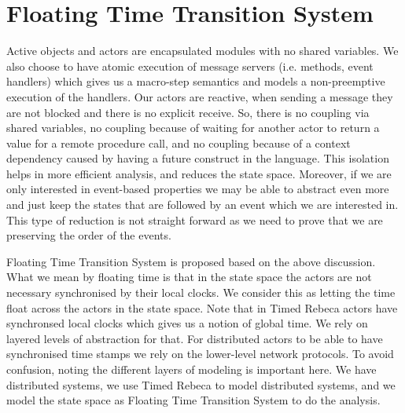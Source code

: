 \section{Floating Time Transition System} \label{sec::FTTS}
Active objects and actors are encapsulated modules with no shared variables. We also choose to have atomic execution of message servers (i.e. methods, event handlers) which gives us a macro-step semantics and models a non-preemptive execution of the handlers.
Our actors are reactive, when sending a message they are not blocked and there is no explicit receive. So, there is no coupling via shared variables, no coupling because of waiting for another actor to return a value for a remote procedure call, and no coupling because of a context dependency caused by having a future  construct in the language.
This isolation helps in more efficient analysis, and reduces the state space.
Moreover, if we are only interested in event-based properties we may be able to abstract even more and just keep the states that are followed by an event which we are interested in. This type of reduction is not straight forward as we need to prove that we are preserving the order of the events.

Floating Time Transition System is proposed based on the above discussion. What we mean by floating time is that in the state space the actors are not necessary synchronised by their local clocks. We consider this as letting the time float across the actors in the state space. 
Note that in Timed Rebeca actors have synchronsed local clocks which gives us a notion of global time. We rely on layered levels of abstraction for that. For distributed actors to be able to have synchronised time stamps we rely on the lower-level network protocols.
To avoid confusion, noting the different layers of modeling is important here. We have distributed systems, we use Timed Rebeca to model distributed systems, and we model the state space as Floating Time Transition System to do the analysis. 



